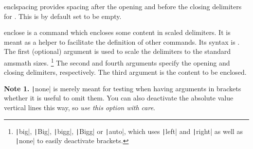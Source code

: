 \documentclass[english,a4paper,DIV=12,parskip=full,oneside]{scrartcl}
\begin{document}
    \begin{commandlist}
        \item[enclspacing] provides spacing after the opening and before the closing delimiters for \codeCommand{\enclose}.
            This is by default set to be empty.
        \item[enclose] is a command which encloses some content in scaled delimiters.
            It is meant as a helper to facilitate the definition of other commands.
            Its syntax is .
            The first (optional) argument is used to scale the delimiters to the standard amsmath sizes.%
            \footnote{\texttt|big|, \texttt|Big|, \texttt|bigg|, \texttt|Bigg| or \texttt|auto|, which uses \texttt|left| and \texttt|right| as well as \texttt|none| to easily deactivate brackets.\label{footnote:amsmath_sizes}}
            The second and fourth arguments specify the opening and closing delimiters, respectively.
            The third argument is the content to be enclosed.
            \par\mathCodeExample{\enclose{[}{\dfrac{1}{2}}{]}} %
            \par\mathCodeExample{\enclose[Big][{\dfrac{1}{2}}]} %
            \par\mathCodeExample{\enclose[auto]{[}{\dfrac{1}{2}}{]}} %
            \par\mathCodeExample{\enclose[none]{[}{\dfrac{1}{2}}{]}} %

            \textbf{Note 1.} \texttt|none| is merely meant for testing when having arguments
            in brackets whether it is useful to omit them. You can also deactivate the absolute value
            vertical lines this way, so \emph{use this option with care}.


\end{commandlist}
\end{document}
